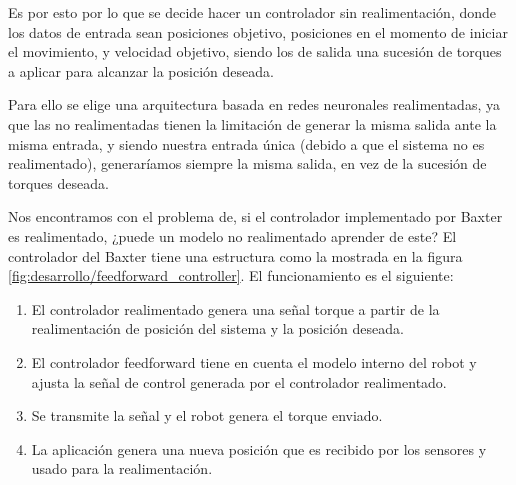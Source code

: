 Es por esto por lo que se decide hacer un controlador sin realimentación, donde los datos de entrada sean posiciones objetivo, posiciones en el momento de iniciar el movimiento, y velocidad objetivo, siendo los de salida una sucesión de torques a aplicar para alcanzar la posición deseada.

Para ello se elige una arquitectura basada en redes neuronales realimentadas, ya que las no realimentadas tienen la limitación de generar la misma salida ante la misma entrada, y siendo nuestra entrada única (debido a que el sistema no es realimentado), generaríamos siempre la misma salida, en vez de la sucesión de torques deseada.

Nos encontramos con el problema de, si el controlador implementado por Baxter es realimentado, ¿puede un modelo no realimentado aprender de este? %
El controlador del Baxter tiene una estructura como la mostrada en la figura \ref{fig:desarrollo/feedforward_controller}. El funcionamiento es el siguiente:

\begin{enumerate}
\item El controlador realimentado genera una señal torque a partir de la realimentación de posición del sistema y la posición deseada.
\item El controlador feedforward tiene en cuenta el modelo interno del robot y ajusta la señal de control generada por el controlador realimentado.
\item Se transmite la señal y el robot genera el torque enviado.
\item La aplicación genera una nueva posición que es recibido por los sensores y usado para la realimentación.
\end{enumerate}

